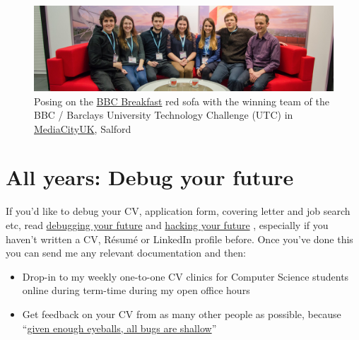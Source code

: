 \documentclass[
  12pt,
]{book}
\providecommand{\tightlist}{%
  \setlength{\itemsep}{0pt}\setlength{\parskip}{0pt}}
\begin{document}
\begin{figure}

{\centering \includegraphics[width=1\linewidth]{images/bbcbreakfastsofa} 

}

\caption{Posing on the \href{https://en.wikipedia.org/wiki/BBC_Breakfast}{BBC Breakfast} red sofa with the winning team of the BBC / Barclays University Technology Challenge (UTC) in \href{https://en.wikipedia.org/wiki/MediaCityUK}{MediaCityUK}, Salford}\label{fig:unnamed-chunk-1}
\end{figure}



\hypertarget{allyears}{%
\section{All years: Debug your future}\label{allyears}}

If you'd like to debug your CV, application form, covering letter and job search etc, read \href{https://www.cdyf.me/debugging}{debugging your future} \citep{debugyourfuture} and \href{https://www.cdyf.me/hacking}{hacking your future} \citep{hackingyourfuture}, especially if you haven't written a CV, Résumé or LinkedIn profile before. Once you've done this you can send me any relevant documentation and then:

\begin{itemize}
\tightlist
\item
  Drop-in to my weekly one-to-one CV clinics for Computer Science students online during term-time during my open office hours
\item
  Get feedback on your CV from as many other people as possible, because ``\href{https://en.wikipedia.org/wiki/Linus\%27s_law}{given enough eyeballs, all bugs are shallow}'' \citep{Raymond1999}
\end{itemize}
\end{document}
